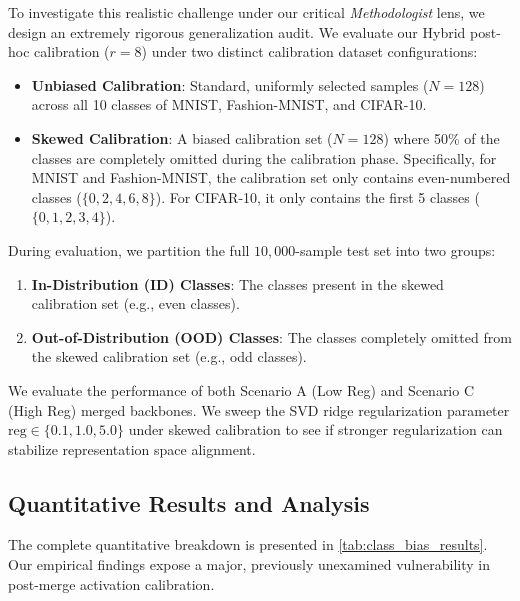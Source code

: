 \documentclass{article}
\theoremstyle{plain}
\theoremstyle{definition}
\theoremstyle{remark}
\begin{document}
To investigate this realistic challenge under our critical \textit{Methodologist} lens, we design an extremely rigorous generalization audit. We evaluate our Hybrid post-hoc calibration ($r=8$) under two distinct calibration dataset configurations:
\begin{itemize}
    \item \textbf{Unbiased Calibration}: Standard, uniformly selected samples ($N=128$) across all 10 classes of MNIST, Fashion-MNIST, and CIFAR-10.
    \item \textbf{Skewed Calibration}: A biased calibration set ($N=128$) where 50\% of the classes are completely omitted during the calibration phase. Specifically, for MNIST and Fashion-MNIST, the calibration set only contains even-numbered classes ($\{0, 2, 4, 6, 8\}$). For CIFAR-10, it only contains the first 5 classes ($\{0, 1, 2, 3, 4\}$).
\end{itemize}

During evaluation, we partition the full $10,000$-sample test set into two groups:
\begin{enumerate}
    \item \textbf{In-Distribution (ID) Classes}: The classes present in the skewed calibration set (e.g., even classes).
    \item \textbf{Out-of-Distribution (OOD) Classes}: The classes completely omitted from the skewed calibration set (e.g., odd classes).
\end{enumerate}
We evaluate the performance of both Scenario A (Low Reg) and Scenario C (High Reg) merged backbones. We sweep the SVD ridge regularization parameter $\text{reg} \in \{0.1, 1.0, 5.0\}$ under skewed calibration to see if stronger regularization can stabilize representation space alignment.

\subsection{Quantitative Results and Analysis}
The complete quantitative breakdown is presented in \cref{tab:class_bias_results}. Our empirical findings expose a major, previously unexamined vulnerability in post-merge activation calibration.
\end{document}

